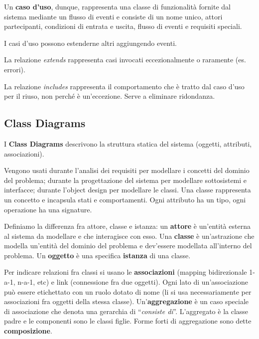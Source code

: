\documentclass{article}
\begin{document}
        \vspace{3mm}
        
        Un \textbf{caso d’uso}, dunque, rappresenta una classe di funzionalità fornite dal sistema mediante un flusso di eventi e consiste di un nome unico, attori partecipanti, condizioni di entrata e uscita, flusso di eventi e requisiti speciali.
        
        I casi d’uso possono estenderne altri aggiungendo eventi. 
        
        \vspace{3mm}
        
        La relazione \textit{extends} rappresenta casi invocati eccezionalmente o raramente (es. errori).
        
        La relazione \textit{includes} rappresenta il comportamento che è tratto dal caso d’uso per il riuso, non perché è un’eccezione. Serve a eliminare ridondanza.

    \subsection{Class Diagrams}

        I \textbf{Class Diagrams} descrivono la struttura statica del sistema (oggetti, attributi, associazioni).
        
        \vspace{3mm}
        
        Vengono usati durante l’analisi dei requisiti per modellare i concetti del dominio del problema; durante la progettazione del sistema per modellare sottosistemi e interfacce; durante l’object design per modellare le classi. Una classe rappresenta un concetto e incapsula stati e comportamenti. Ogni attributo ha un tipo, ogni operazione ha una signature. 
        
        \vspace{3mm}
        
        Definiamo la differenza fra attore, classe e istanza: un \textbf{attore} è un’entità esterna al sistema da modellare e che interagisce con esso. Una \textbf{classe} è un’astrazione che modella un’entità del dominio del problema e dev’essere modellata all’interno del problema. Un \textbf{oggetto} è una specifica \textbf{istanza} di una classe. 
        
        \vspace{3mm}
        
        Per indicare relazioni fra classi si usano le \textbf{associazioni} (mapping bidirezionale 1-a-1, n-a-1, etc) e link (connessione fra due oggetti). Ogni lato di un’associazione può essere etichettato con un ruolo dotato di nome (li si usa necessariamente per associazioni fra oggetti della stessa classe). Un’\textbf{aggregazione} è un caso speciale di associazione che denota una gerarchia di “\textit{consiste di}”. L’aggregato è la classe padre e le componenti sono le classi figlie. Forme forti di aggregazione sono dette \textbf{composizione}. 
        
\end{document}
